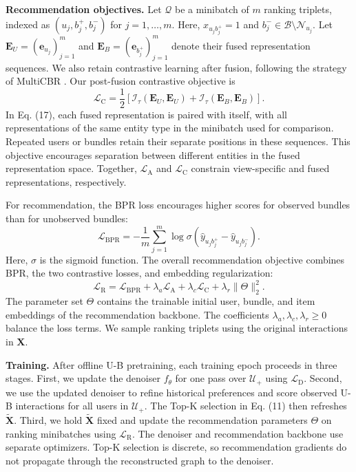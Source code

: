 \documentclass[letterpaper]{article}
\begin{document}
\textbf{Recommendation objectives.} Let $\mathcal Q$ be a minibatch of $m$ ranking triplets, indexed as $(u_j,b_j^+,b_j^-)$ for $j=1,\ldots,m$. Here, $x_{u_jb_j^+}=1$ and $b_j^-\in\mathcal B\setminus\mathcal N_{u_j}$. Let $\mathbf E_U=(\mathbf e_{u_j})_{j=1}^{m}$ and $\mathbf E_B=(\mathbf e_{b_j^+})_{j=1}^{m}$ denote their fused representation sequences. We also retain contrastive learning after fusion, following the strategy of MultiCBR \cite{ma2024multicbr}. Our post-fusion contrastive objective is
\begin{equation}
\mathcal L_{\mathrm C}
=\frac{1}{2}\left[
\mathcal I_\tau(\mathbf E_U,\mathbf E_U)
+\mathcal I_\tau(\mathbf E_B,\mathbf E_B)
\right].
\tag{17}
\end{equation}
In Eq. (17), each fused representation is paired with itself, with all representations of the same entity type in the minibatch used for comparison. Repeated users or bundles retain their separate positions in these sequences. This objective encourages separation between different entities in the fused representation space. Together, $\mathcal L_{\mathrm A}$ and $\mathcal L_{\mathrm C}$ constrain view-specific and fused representations, respectively.

For recommendation, the BPR loss \cite{rendle2009bpr} encourages higher scores for observed bundles than for unobserved bundles:
\begin{equation}
\mathcal L_{\mathrm{BPR}}
=-\frac{1}{m}
\sum_{j=1}^{m}
\log\sigma\!\left(\hat y_{u_jb_j^+}-\hat y_{u_jb_j^-}\right).
\tag{18}
\end{equation}
Here, $\sigma$ is the sigmoid function. The overall recommendation objective combines BPR, the two contrastive losses, and embedding regularization:
\begin{equation}
\mathcal L_{\mathrm R}
=\mathcal L_{\mathrm{BPR}}
+\lambda_a\mathcal L_{\mathrm A}
+\lambda_c\mathcal L_{\mathrm C}
+\lambda_r\|\Theta\|_2^2.
\tag{19}
\end{equation}
The parameter set $\Theta$ contains the trainable initial user, bundle, and item embeddings of the recommendation backbone. The coefficients $\lambda_a,\lambda_c,\lambda_r\geq0$ balance the loss terms. We sample ranking triplets using the original interactions in $\mathbf X$.

\textbf{Training.} After offline U-B pretraining, each training epoch proceeds in three stages. First, we update the denoiser $f_\theta$ for one pass over $\mathcal U_+$ using $\mathcal L_{\mathrm D}$. Second, we use the updated denoiser to refine historical preferences and score observed U-B interactions for all users in $\mathcal U_+$. The Top-K selection in Eq. (11) then refreshes $\widetilde{\mathbf X}$. Third, we hold $\widetilde{\mathbf X}$ fixed and update the recommendation parameters $\Theta$ on ranking minibatches using $\mathcal L_{\mathrm R}$. The denoiser and recommendation backbone use separate optimizers. Top-K selection is discrete, so recommendation gradients do not propagate through the reconstructed graph to the denoiser.
\end{document}
